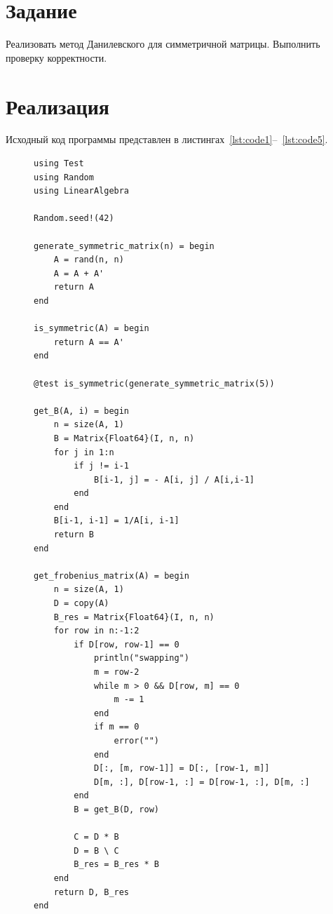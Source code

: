 \documentclass[a4paper, 14pt]{extarticle}
\begin{document}
\renewcommand{\ttdefault}{pcr}

\setlength{\tabcolsep}{3pt}
\newpage
\setcounter{page}{2}

\section{Задание}\label{Sect::task}

Реализовать метод Данилевского для симметричной матрицы. Выполнить проверку
корректности.

\section{Реализация}\label{Sect::impl}

Исходный код программы представлен в листингах~\ref{lst:code1}--~\ref{lst:code5}.

\begin{figure}[!htb]
\begin{lstlisting}[language={},caption={Метод Данилевского},label={lst:code1}]
using Test
using Random
using LinearAlgebra

Random.seed!(42)

generate_symmetric_matrix(n) = begin
    A = rand(n, n)
    A = A + A'
    return A
end

is_symmetric(A) = begin
    return A == A'
end

@test is_symmetric(generate_symmetric_matrix(5))

get_B(A, i) = begin
    n = size(A, 1)
    B = Matrix{Float64}(I, n, n)
    for j in 1:n
        if j != i-1
            B[i-1, j] = - A[i, j] / A[i,i-1]
        end
    end
    B[i-1, i-1] = 1/A[i, i-1]
    return B
end

get_frobenius_matrix(A) = begin
    n = size(A, 1)
    D = copy(A)
    B_res = Matrix{Float64}(I, n, n)
    for row in n:-1:2
        if D[row, row-1] == 0
            println("swapping")
            m = row-2
            while m > 0 && D[row, m] == 0
                m -= 1
            end
            if m == 0
                error("")
            end
            D[:, [m, row-1]] = D[:, [row-1, m]]
            D[m, :], D[row-1, :] = D[row-1, :], D[m, :]
        end
        B = get_B(D, row)

        C = D * B
        D = B \ C
        B_res = B_res * B
    end
    return D, B_res
end

\end{lstlisting}
\end{figure}
\end{document}
